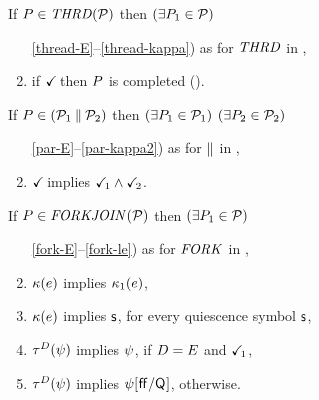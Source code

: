
\begin{definition}%
  \label{def:pomsets-fj}
  \noindent
  If $\aPS \in \sTHREAD{\aPSS}$ then $(\exists P_1\in\mathcal{P})$
  \begin{enumerate}
    \setcounter{enumi}{\value{pomsetXThreadCount}}
  \item[\ref{thread-E}--\ref{thread-kappa})] as for $\sTHREAD{}$ in , %
    
  \item %
    if $\checkmark\!$ then $P$ is completed ().
  \end{enumerate}

  \noindent
  If $P \in (\mathcal{P}_1\mathbin{\parallel}\mathcal{P}_2)$ then $(\exists P_1\in\mathcal{P}_1)$
  $(\exists P_2\in\mathcal{P}_2)$
  \begin{enumerate}
    \setcounter{enumi}{\value{pomsetPreParCount}}
  \item[\ref{par-E}--\ref{par-kappa2})] as for $\mathbin{\parallel}$ in
    ,
  \item \label{par-tick} $\checkmark\!$ implies $\checkmark\!_1\land\checkmark\!_2$.
  \end{enumerate}

  \noindent
  If $\aPS \in \sFORKJOIN{\aPSS}$ then $(\exists P_1\in\mathcal{P})$
  \begin{enumerate}
    \setcounter{enumi}{\value{pomsetXForkCount}}
  \item[\ref{fork-E}--\ref{fork-le})] as for $\sFORK{}$ in ,
  \item
    $\kappa(e)$ implies $\kappa_1(e)$,    
  \item 
    $\kappa(e)$ implies $\mathsf{s}$, for every quiescence symbol $\mathsf{s}$,
  \item
    $\aTr{\bEvs}{\bForm}$ implies $\psi$, if $D=E$ and $\checkmark\!_1$,
  \item %
    $\aTr{\bEvs}{\bForm}$ implies $\psi[\mkern.6mu\mathsf{ff}\mkern.6mu/\mathsf{Q}_{}]$, otherwise.
  \end{enumerate}
\end{definition}
